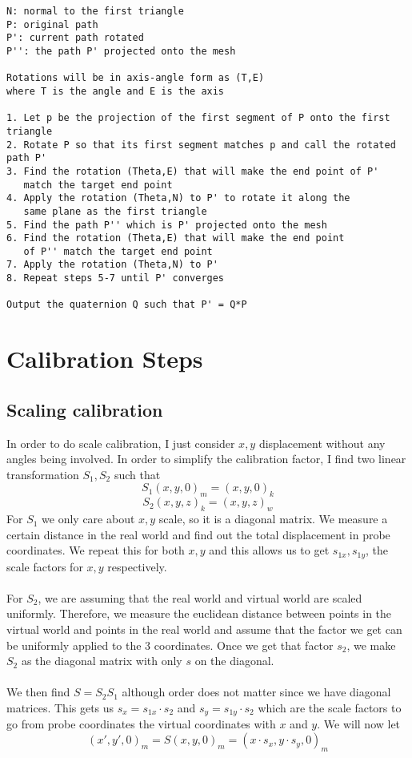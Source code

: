 \documentclass[conference]{acmsiggraph}
\begin{document}
\begin{verbatim}
N: normal to the first triangle
P: original path
P': current path rotated
P'': the path P' projected onto the mesh

Rotations will be in axis-angle form as (T,E) 
where T is the angle and E is the axis

1. Let p be the projection of the first segment of P onto the first triangle
2. Rotate P so that its first segment matches p and call the rotated path P'
3. Find the rotation (Theta,E) that will make the end point of P' 
   match the target end point
4. Apply the rotation (Theta,N) to P' to rotate it along the 
   same plane as the first triangle
5. Find the path P'' which is P' projected onto the mesh
6. Find the rotation (Theta,E) that will make the end point 
   of P'' match the target end point
7. Apply the rotation (Theta,N) to P'
8. Repeat steps 5-7 until P' converges

Output the quaternion Q such that P' = Q*P

\end{verbatim}

\section{Calibration Steps}

\subsection{Scaling calibration}

In order to do scale calibration, I just consider $x,y$ displacement without any angles being involved. In order to simplify the calibration factor, I find two linear transformation $S_1,S_2$ such that 
\[
S_1(x,y,0)_m = (x,y,0)_k
\]
\[
S_2(x,y,z)_k = (x,y,z)_w
\]
For $S_1$ we only care about $x,y$ scale, so it is a diagonal matrix. We measure a certain distance in the real world and find out the total displacement in probe coordinates. We repeat this for both $x,y$ and this allows us to get $s_{1x},s_{1y}$, the scale factors for $x,y$ respectively. \\
\\
For $S_2$, we are assuming that the real world and virtual world are scaled uniformly. Therefore, we measure the euclidean distance between points in the virtual world and points in the real world and assume that the factor we get can be uniformly applied to the 3 coordinates. Once we get that factor $s_2$, we make $S_2$ as the diagonal matrix with only $s$ on the diagonal. \\
\\
We then find $S=S_2S_1$ although order does not matter since we have diagonal matrices. This gets us $s_x=s_{1x} \cdot s_2$ and $s_y=s_{1y} \cdot s_2$ which are the scale factors to go from probe coordinates the virtual coordinates with $x$ and $y$. We will now let
\[
(x',y',0)_m = S(x,y,0)_m = (x \cdot s_x, y \cdot s_y, 0)_m
\]
\end{document}
